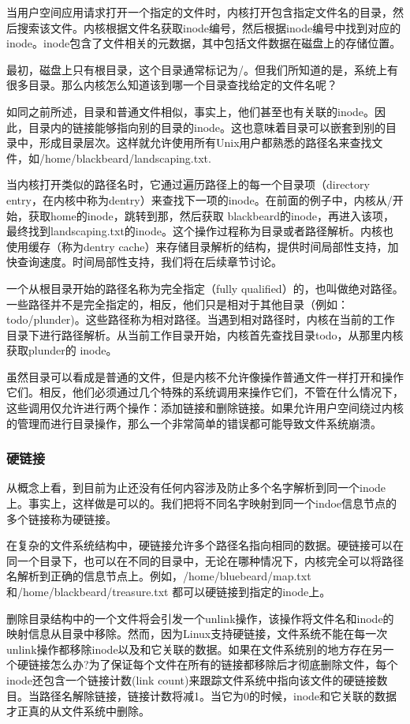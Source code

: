 当用户空间应用请求打开一个指定的文件时，内核打开包含指定文件名的目录，然后搜索该文件。内核根据文件名获取inode编号，然后根据inode编号中找到对应的inode。inode包含了文件相关的元数据，其中包括文件数据在磁盘上的存储位置。


最初，磁盘上只有根目录，这个目录通常标记为/。但我们所知道的是，系统上有很多目录。那么内核怎么知道该到哪一个目录查找给定的文件名呢？

如同之前所述，目录和普通文件相似，事实上，他们甚至也有关联的inode。因此，目录内的链接能够指向别的目录的inode。这也意味着目录可以嵌套到别的目录中，形成目录层次。这样就允许使用所有Unix用户都熟悉的路径名来查找文件，如/home/blackbeard/landscaping.txt.

当内核打开类似的路径名时，它通过遍历路径上的每一个目录项（directory entry，在内核中称为dentry）来查找下一项的inode。在前面的例子中，内核从/开始，获取home的inode，跳转到那，然后获取 blackbeard的inode，再进入该项，最终找到landscaping.txt的inode。这个操作过程称为目录或者路径解析。内核也使用缓存（称为dentry cache）来存储目录解析的结构，提供时间局部性支持，加快查询速度。时间局部性支持，我们将在后续章节讨论。

一个从根目录开始的路径名称为完全指定（fully qualified）的，也叫做绝对路径。一些路径并不是完全指定的，相反，他们只是相对于其他目录（例如：todo/plunder)。这些路径称为相对路径。当遇到相对路径时，内核在当前的工作目录下进行路径解析。从当前工作目录开始，内核首先查找目录todo，从那里内核获取plunder的 inode。

虽然目录可以看成是普通的文件，但是内核不允许像操作普通文件一样打开和操作它们。相反，他们必须通过几个特殊的系统调用来操作它们，不管在什么情况下，这些调用仅允许进行两个操作：添加链接和删除链接。如果允许用户空间绕过内核的管理而进行目录操作，那么一个非常简单的错误都可能导致文件系统崩溃。

\subsubsection{硬链接}

从概念上看，到目前为止还没有任何内容涉及防止多个名字解析到同一个inode上。事实上，这样做是可以的。我们把将不同名字映射到同一个indoe信息节点的多个链接称为硬链接。

在复杂的文件系统结构中，硬链接允许多个路径名指向相同的数据。硬链接可以在同一个目录下，也可以在不同的目录中，无论在哪种情况下，内核完全可以将路径名解析到正确的信息节点上。例如，/home/bluebeard/map.txt 和/home/blackbeard/treasure.txt 都可以硬链接到指定的inode上。

删除目录结构中的一个文件将会引发一个unlink操作，该操作将文件名和inode的映射信息从目录中移除。然而，因为Linux支持硬链接，文件系统不能在每一次unlink操作都移除inode以及和它关联的数据。如果在文件系统别的地方存在另一个硬链接怎么办?为了保证每个文件在所有的链接都移除后才彻底删除文件，每个inode还包含一个链接计数(link count)来跟踪文件系统中指向该文件的硬链接数目。当路径名解除链接，链接计数将减1。当它为0的时候，inode和它关联的数据才正真的从文件系统中删除。

